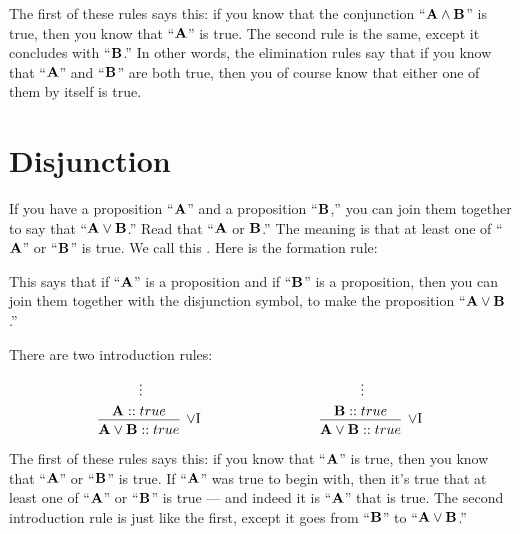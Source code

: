 \documentclass[../../../main.tex]{subfiles}
\begin{document}
\noindent
The first of these rules says this: if you know that the conjunction ``$\nd{A} \conj/ \nd{B}$'' is true, then you know that ``$\mathbf{A}$'' is true. The second rule is the same, except it concludes with ``$\mathbf{B}$.'' In other words, the elimination rules say that if you know that ``$\mathbf{A}$'' and ``$\mathbf{B}$'' are both true, then you of course know that either one of them by itself is true.


\section{Disjunction}

If you have a proposition ``$\mathbf{A}$'' and a proposition ``$\mathbf{B}$,'' you can join them together to say that ``$\nd{A} \disj/ \nd{B}$.'' Read that ``$\mathbf{A}$ or $\mathbf{B}$.'' The meaning is that at least one of ``$\mathbf{A}$'' or ``$\mathbf{B}$'' is true. We call this . Here is the formation rule:

\begin{prooftree*}
\end{prooftree*}

\noindent
This says that if ``$\mathbf{A}$'' is a proposition and if ``$\mathbf{B}$'' is a proposition, then you can join them together with the disjunction symbol, to make the proposition ``$\nd{A} \disj/ \nd{B}$.''

There are two introduction rules:

$$
\begin{prooftree}
  \hypo{}
  \ellipsis{}{}
  \infer[no rule]1{\nd{A} :: true}
  \infer1[\disjIntro/]{\nd{A} \disj/ \nd{B} :: true}
\end{prooftree}
\hskip 3cm
\begin{prooftree}
  \hypo{}
  \ellipsis{}{}
  \infer[no rule]1{\nd{B} :: true}
  \infer1[\disjIntro/]{\nd{A} \disj/ \nd{B} :: true}
\end{prooftree}
$$

\noindent
The first of these rules says this: if you know that ``$\mathbf{A}$'' is true, then you know that ``$\mathbf{A}$'' or ``$\mathbf{B}$'' is true. If ``$\mathbf{A}$'' was true to begin with, then it's true that at least one of ``$\mathbf{A}$'' or ``$\mathbf{B}$'' is true --- and indeed it is ``$\mathbf{A}$'' that is true. The second introduction rule is just like the first, except it goes from ``$\mathbf{B}$'' to ``$\nd{A} \disj/ \nd{B}$.''
\end{document}

